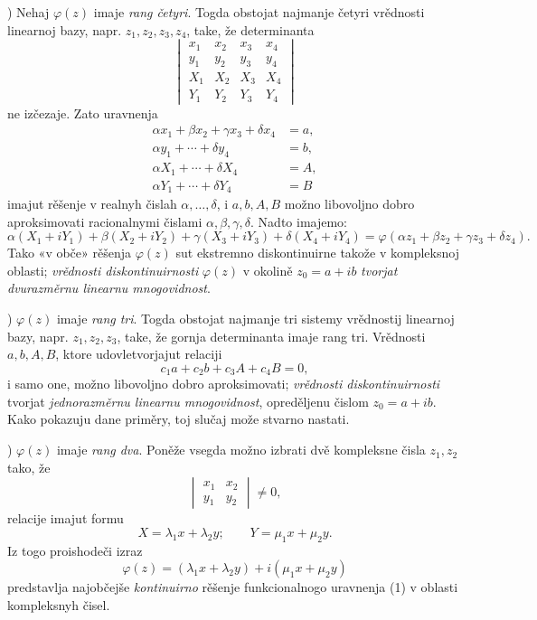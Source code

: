 \documentclass[11pt]{article}
\begin{document}
) Nehaj \(\varphi(z)\) imaje {\itshape rang četyri}. Togda obstojat najmanje četyri vrědnosti linearnoj bazy, napr. \(z_1,z_2,z_3,z_4\), take, že determinanta
\[
\begin{vmatrix}
x_1&x_2&x_3&x_4\\
y_1&y_2&y_3&y_4\\
X_1&X_2&X_3&X_4\\
Y_1&Y_2&Y_3&Y_4
\end{vmatrix}
\]
ne izčezaje. Zato uravnenja
\[
\begin{aligned}
\alpha x_1+\beta x_2+\gamma x_3+\delta x_4&=a,\\
\alpha y_1+\cdots+\delta y_4&=b,\\
\alpha X_1+\cdots+\delta X_4&=A,\\
\alpha Y_1+\cdots+\delta Y_4&=B
\end{aligned}
\]
imajut rěšenje v realnyh čislah \(\alpha,\ldots,\delta\), i \(a,b,A,B\) možno libovoljno dobro aproksimovati racionalnymi čislami \(\alpha,\beta,\gamma,\delta\). Nadto imajemo:
\[
\alpha(X_1+iY_1)+\beta(X_2+iY_2)+\gamma(X_3+iY_3)+\delta(X_4+iY_4)
 =\varphi(\alpha z_1+\beta z_2+\gamma z_3+\delta z_4).
\]
Tako «v obče» rěšenja \(\varphi(z)\) sut ekstremno diskontinuirne takože v kompleksnoj oblasti; {\itshape vrědnosti diskontinuirnosti} \(\varphi(z)\) v okolině \(z_0=a+ib\) {\itshape tvorjat dvurazměrnu linearnu mnogovidnost}.

) \(\varphi(z)\) imaje {\itshape rang tri}. Togda obstojat najmanje tri sistemy vrědnostij linearnoj bazy, napr. \(z_1,z_2,z_3\), take, že gornja determinanta imaje rang tri. Vrědnosti \(a,b,A,B\), ktore udovletvorjajut relaciji
\[
c_1a+c_2b+c_3A+c_4B=0,
\]
i samo one, možno libovoljno dobro aproksimovati; {\itshape vrědnosti diskontinuirnosti} tvorjat {\itshape jednorazměrnu linearnu mnogovidnost}, opreděljenu čislom \(z_0=a+ib\). Kako pokazuju dane priměry, toj slučaj može stvarno nastati.

) \(\varphi(z)\) imaje {\itshape rang dva}. Poněže vsegda možno izbrati dvě kompleksne čisla \(z_1,z_2\) tako, že
\[
\begin{vmatrix}x_1&x_2\\ y_1&y_2\end{vmatrix}\ne0,
\]
relacije imajut formu
\[
X=\lambda_1x+\lambda_2y;\qquad Y=\mu_1x+\mu_2y.
\]
Iz togo proishodeči izraz
\[
\varphi(z)=(\lambda_1x+\lambda_2y)+i(\mu_1x+\mu_2y)
\]
predstavlja najobčejše {\itshape kontinuirno} rěšenje funkcionalnogo uravnenja (1) v oblasti kompleksnyh čisel.
\end{document}
